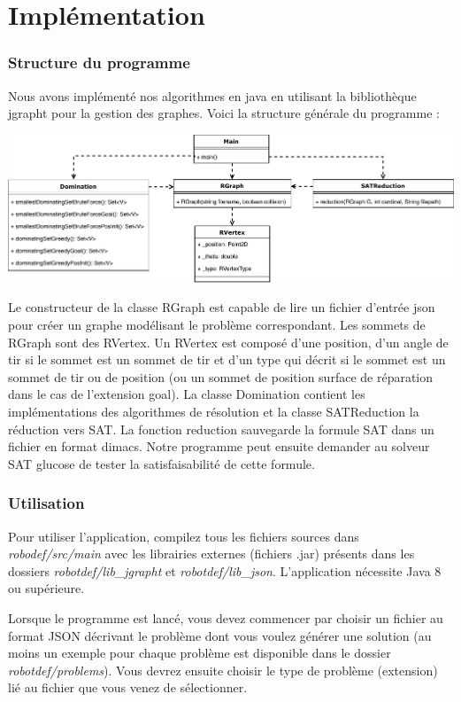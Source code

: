 \part{Implémentation}

\section{Structure du programme}
Nous avons implémenté nos algorithmes en java en utilisant la bibliothèque jgrapht pour la gestion des graphes. Voici la structure générale du programme :\newline

\scalebox{0.7} {
\includegraphics{robotdef.pdf}
} \newline

Le constructeur de la classe RGraph est capable de lire un fichier d'entrée json pour créer un graphe modélisant le problème correspondant. Les sommets de RGraph sont des RVertex. Un RVertex est composé d'une position, d'un angle de tir si le sommet est un sommet de tir et d'un type qui décrit si le sommet est un sommet de tir ou de position (ou un sommet de position surface de réparation dans le cas de l'extension goal). La classe Domination contient les implémentations des algorithmes de résolution et la classe SATReduction la réduction vers SAT. La fonction reduction sauvegarde la formule SAT dans un fichier en format dimacs. Notre programme peut ensuite demander au solveur SAT glucose de tester la satisfaisabilité de cette formule.

\section{Utilisation}

Pour utiliser l'application, compilez tous les fichiers sources dans \textit{robodef/src/main} avec les librairies externes (fichiers .jar) présents dans les dossiers \textit{robotdef/lib\_jgrapht} et \textit{robotdef/lib\_json}. L'application nécessite Java 8 ou supérieure.

Lorsque le programme est lancé, vous devez commencer par choisir un fichier au format JSON décrivant le problème dont vous voulez générer une solution (au moins un exemple pour chaque problème est disponible dans le dossier \textit{robotdef/problems}).  Vous devrez ensuite choisir le type de problème (extension) lié au fichier que vous venez de sélectionner.


